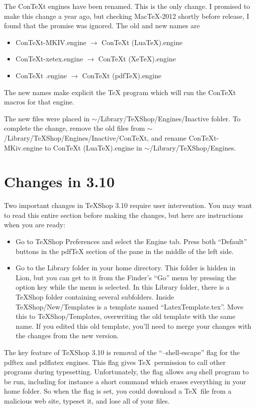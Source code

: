 \documentclass[11pt, oneside]{amsart}
\begin{document}
The ConTeXt engines have been renamed. This is the only change. I promised to make this change a year ago, but checking MacTeX-2012 shortly
before release, I found that the promise was ignored. The old and new names are
\begin{itemize}
\item ConTeXt-MKIV.engine $\rightarrow$ ConTeXt (LuaTeX).engine
\item ConTeXt-xetex.engine $\rightarrow$ ConTeXt (XeTeX).engine
\item ConTeXt .engine $\rightarrow$ ConTeXt (pdfTeX).engine
\end{itemize}
The new names make explicit the TeX program which will run the ConTeXt macros for that engine.

The new files were placed in  $\sim$/Library/TeXShop/Engines/Inactive folder. To complete the change,
remove the old files from $\sim$/Library/TeXShop/Engines/Inactive/ConTeXt, and rename
 ConTeXt-MKiv.engine to ConTeXt (LuaTeX).engine  in $\sim$/Library/TeXShop/Engines.

\section{Changes in 3.10}

Two important changes in TeXShop 3.10 require user intervention. You may want to read this entire section before making the changes, but here are instructions when you are ready:
\begin{itemize}
\item Go to TeXShop Preferences and select the Engine tab. Press both ``Default'' buttons in the pdfTeX section of the pane in the middle of the left side.
\item Go to the Library folder in your home directory. This folder is hidden in Lion, but you can get to it from the Finder's ``Go'' menu by pressing the option key while the menu is selected.  In this Library folder, there is a TeXShop folder containing several subfolders. Inside TeXShop/New/Templates is a template named
``LatexTemplate.tex''. Move this to TeXShop/Templates, overwriting the old template with the same name. If you edited this old template, you'll need to merge
your changes with the changes from the new version.
\end{itemize}

The key feature of TeXShop 3.10 is removal of the ``--shell-escape'' flag for the pdftex and pdflatex engines. This flag gives \TeX\  permission to
call other programs during typesetting. Unfortunately, the flag allows {\em any} shell program to be run, including for instance a short command which erases everything in your home folder. So when the flag is set, you could download a \TeX\ file from a malicious web site, typeset it, and lose all of your files.
\end{document}
